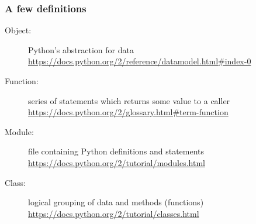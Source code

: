 \begin{frame}[fragile]
\frametitle{A few definitions}

\begin{description}
\item[Object:] Python's abstraction for data\\
\url{https://docs.python.org/2/reference/datamodel.html#index-0}
\item[Function:] series of statements which returns some value to a caller\\
\url{https://docs.python.org/2/glossary.html#term-function}
\item[Module:] file containing Python definitions and statements\\
\url{https://docs.python.org/2/tutorial/modules.html}
\item[Class:] logical grouping of data and methods (functions)\\
\url{https://docs.python.org/2/tutorial/classes.html}
\end{description}

\end{frame}


